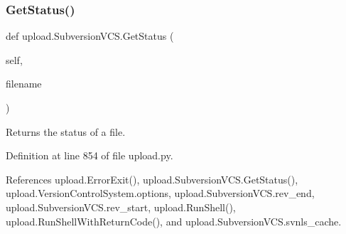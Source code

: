\subsubsection{\texorpdfstring{Get\+Status()}{GetStatus()}\hspace{0.1cm}{\footnotesize\ttfamily [1/2]}}
{\footnotesize\ttfamily def upload.\+Subversion\+V\+C\+S.\+Get\+Status (\begin{DoxyParamCaption}\item[{}]{self,  }\item[{}]{filename }\end{DoxyParamCaption})}

\begin{DoxyVerb}Returns the status of a file.\end{DoxyVerb}
 

Definition at line 854 of file upload.\+py.



References upload.\+Error\+Exit(), upload.\+Subversion\+V\+C\+S.\+Get\+Status(), upload.\+Version\+Control\+System.\+options, upload.\+Subversion\+V\+C\+S.\+rev\+\_\+end, upload.\+Subversion\+V\+C\+S.\+rev\+\_\+start, upload.\+Run\+Shell(), upload.\+Run\+Shell\+With\+Return\+Code(), and upload.\+Subversion\+V\+C\+S.\+svnls\+\_\+cache.



